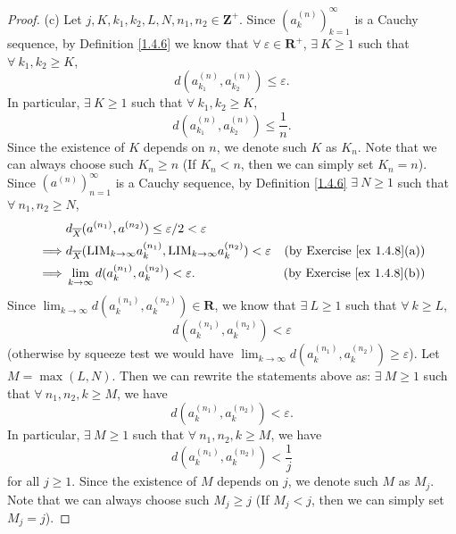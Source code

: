 \begin{proof}{(c)}
    Let \(j, K, k_1, k_2, L, N, n_1, n_2 \in \mathbf{Z}^+\).
    Since \((a_k^{(n)})_{k = 1}^\infty\) is a Cauchy sequence, by Definition \ref{1.4.6} we know that \(\forall\ \varepsilon \in \mathbf{R}^+\), \(\exists\ K \geq 1\) such that \(\forall\ k_1, k_2 \geq K\),
    \[
        d(a_{k_1}^{(n)}, a_{k_2}^{(n)}) \leq \varepsilon.
    \]
    In particular, \(\exists\ K \geq 1\) such that \(\forall\ k_1, k_2 \geq K\),
    \[
        d(a_{k_1}^{(n)}, a_{k_2}^{(n)}) \leq \frac{1}{n}.
    \]
    Since the existence of \(K\) depends on \(n\), we denote such \(K\) as \(K_n\).
    Note that we can always choose such \(K_n \geq n\)
    (If \(K_n < n\), then we can simply set \(K_n = n\)).
    Since \((a^{(n)})_{n = 1}^\infty\) is a Cauchy sequence, by Definition \ref{1.4.6} \(\exists\ N \geq 1\) such that \(\forall\ n_1, n_2 \geq N\),
    \begin{align*}
                 & d_{\overline{X}}(a^{(n_1)}, a^{(n_2)}) \leq \varepsilon / 2 < \varepsilon                                                                             \\
        \implies & d_{\overline{X}}(\text{LIM}_{k \to \infty} a_k^{(n_1)}, \text{LIM}_{k \to \infty} a_k^{(n_2)}) < \varepsilon & \text{(by Exercise \ref{ex 1.4.8}(a))} \\
        \implies & \lim_{k \to \infty} d(a_k^{(n_1)}, a_k^{(n_2)}) < \varepsilon.                                               & \text{(by Exercise \ref{ex 1.4.8}(b))}
    \end{align*}
    Since \(\lim_{k \to \infty} d(a_k^{(n_1)}, a_k^{(n_2)}) \in \mathbf{R}\), we know that \(\exists\ L \geq 1\) such that \(\forall\ k \geq L\),
    \[
        d(a_k^{(n_1)}, a_k^{(n_2)}) < \varepsilon
    \]
    (otherwise by squeeze test we would have \(\lim_{k \to \infty} d(a_k^{(n_1)}, a_k^{(n_2)}) \geq \varepsilon\)).
    Let \(M = \max(L, N)\).
    Then we can rewrite the statements above as:
    \(\exists\ M \geq 1\) such that \(\forall\ n_1, n_2, k \geq M\), we have
    \[
        d(a_k^{(n_1)}, a_k^{(n_2)}) < \varepsilon.
    \]
    In particular, \(\exists\ M \geq 1\) such that \(\forall\ n_1, n_2, k \geq M\), we have
    \[
        d(a_k^{(n_1)}, a_k^{(n_2)}) < \frac{1}{j}
    \]
    for all \(j \geq 1\).
    Since the existence of \(M\) depends on \(j\), we denote such \(M\) as \(M_j\).
    Note that we can always choose such \(M_j \geq j\)
    (If \(M_j < j\), then we can simply set \(M_j = j\)).


\end{proof}
